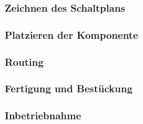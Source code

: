\subsubsection{Zeichnen des Schaltplans}

\subsubsection{Platzieren der Komponente}

\subsubsection{Routing}

\subsubsection{Fertigung und Bestückung}

\subsubsection{Inbetriebnahme}